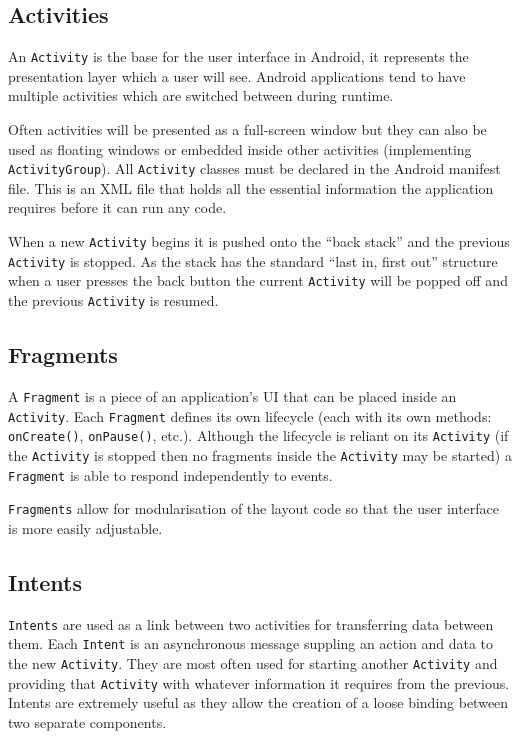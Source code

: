 \documentclass{report}
\begin{document}
\subsection{Activities}
\label{sub:activities}

An {\tt Activity} is the base for the user interface in Android, it represents the presentation layer which a user will see. Android applications tend to have multiple activities which are switched between during runtime.

Often activities will be presented as a full-screen window but they can also be used as floating windows or embedded inside other activities (implementing {\tt ActivityGroup}). All {\tt Activity} classes must be declared in the Android manifest file. This is an XML file that holds all the essential information the application requires before it can run any code.

When a new {\tt Activity} begins it is pushed onto the ``back stack'' and the previous {\tt Activity} is stopped. As the stack has the standard ``last in, first out'' structure when a user presses the back button the current {\tt Activity} will be popped off and the previous {\tt Activity} is resumed. 

\subsection{Fragments}
\label{sub:fragments}

A {\tt Fragment} is a piece of an application's UI that can be placed inside an {\tt Activity}. Each {\tt Fragment} defines its own lifecycle (each with its own methods: {\tt onCreate()}, {\tt onPause()}, etc.). Although the lifecycle is reliant on its {\tt Activity} (if the {\tt Activity} is stopped then no fragments inside the {\tt Activity} may be started) a {\tt Fragment} is able to respond independently to events.

{\tt Fragments} allow for modularisation of the layout code so that the user interface is more easily adjustable.

\subsection{Intents}
\label{sub:intents}

{\tt Intents} are used as a link between two activities for transferring data between them. Each {\tt Intent} is an asynchronous message suppling an action and data to the new {\tt Activity}. They are most often used for starting another {\tt Activity} and providing that {\tt Activity} with whatever information it requires from the previous. Intents are extremely useful as they allow the creation of a loose binding between two separate components.
\end{document}
